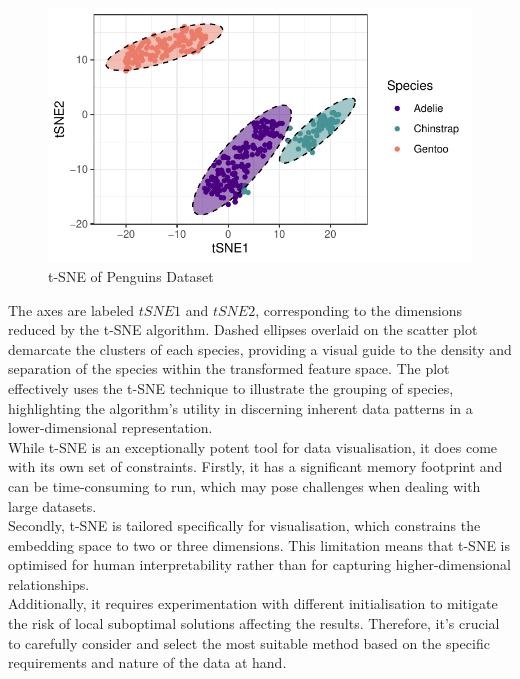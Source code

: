 \documentclass{article}\usepackage[]{graphicx}\usepackage[]{xcolor}
\makeatletter
\def\maxwidth{ %
  \ifdim\Gin@nat@width>\linewidth
    \linewidth
  \else
    \Gin@nat@width
  \fi
}
\newenvironment{knitrout}{}{} %
\numberwithin{equation}{section}
\makeatother
\begin{document}
\begin{knitrout}
\begin{figure}[H]
{\centering \includegraphics[width=\maxwidth]{figure/beamer-t-SNE-1} 

}

\caption[t-SNE of Penguins Dataset]{t-SNE of Penguins Dataset}\label{fig:t-SNE}
\end{figure}

\end{knitrout}

\noindent
The axes are labeled $tSNE1$ and $tSNE2$, corresponding to the dimensions reduced by the t-SNE algorithm. Dashed ellipses overlaid on the scatter plot demarcate the clusters of each species, providing a visual guide to the density and separation of the species within the transformed feature space. The plot effectively uses the t-SNE technique to illustrate the grouping of species, highlighting the algorithm's utility in discerning inherent data patterns in a lower-dimensional representation.\\

\noindent
While t-SNE is an exceptionally potent tool for data visualisation, it does come with its own set of constraints. Firstly, it has a significant memory footprint and can be time-consuming to run, which may pose challenges when dealing with large datasets.\\

\noindent
Secondly, t-SNE is tailored specifically for visualisation, which constrains the embedding space to two or three dimensions. This limitation means that t-SNE is optimised for human interpretability rather than for capturing higher-dimensional relationships.\\

\noindent
Additionally, it requires experimentation with different initialisation to mitigate the risk of local suboptimal solutions affecting the results. Therefore, it's crucial to carefully consider and select the most suitable method based on the specific requirements and nature of the data at hand.
\end{document}
